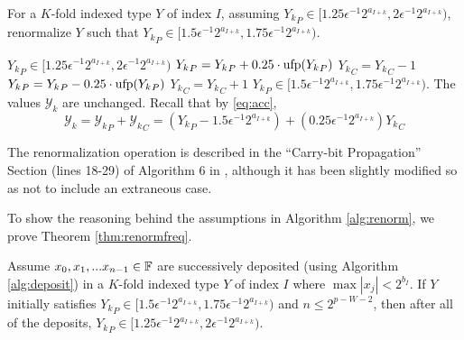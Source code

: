     \begin{samepage}
    \begin{alg}
      For a $K$-fold indexed type $Y$ of index $I$, assuming ${Y_k}_P \in [1.25  \epsilon^{-1} 2^{a_{I + k}}, 2  \epsilon^{-1} 2^{a_{I + k}})$, renormalize $Y$ such that ${Y_k}_P \in [1.5  \epsilon^{-1} 2^{a_{I + k}}, 1.75  \epsilon^{-1} 2^{a_{I + k}})$.
      \begin{algorithmic}[1]
        \Require
          \Statex ${Y_k}_P \in [1.25  \epsilon^{-1} 2^{a_{I + k}}, 2  \epsilon^{-1} 2^{a_{I + k}})$
              \State ${Y_k}_P = {Y_k}_P + 0.25 \cdot \text{ufp}({Y_k}_P)$
              \State ${Y_k}_C = {Y_k}_C - 1$
            \EndIf
              \State ${Y_k}_P = {Y_k}_P - 0.25 \cdot \text{ufp}({Y_k}_P)$
              \State ${Y_k}_C = {Y_k}_C + 1$
            \EndIf
          \EndFor
        \EndFunction
        \Ensure
          \Statex ${Y_k}_P \in [1.5  \epsilon^{-1} 2^{a_{I + k}}, 1.75  \epsilon^{-1} 2^{a_{I + k}})$.
          \Statex The values $\mathcal{Y}_k$ are unchanged. Recall that by \eqref{eq:acc},
          \begin{equation*}
            \mathcal{Y}_k = {\mathcal{Y}_k}_P + {\mathcal{Y}_k}_C = ({Y_k}_P - 1.5 \epsilon^{-1} 2^{a_{I + k}}) + (0.25\epsilon^{-1}2^{a_{I + k}}){Y_k}_C
          \end{equation*}
      \end{algorithmic}
      \label{alg:renorm}
    \end{alg}
    \end{samepage}
    The renormalization operation is described in the ``Carry-bit Propagation'' Section (lines 18-29) of Algorithm $6$ in \cite{repsum}, although it has been slightly modified so as not to include an extraneous case.

    To show the reasoning behind the assumptions in Algorithm \ref{alg:renorm}, we prove Theorem \ref{thm:renormfreq}.

      \begin{samepage}
    \begin{thm}
      Assume $x_0, x_1, ... x_{n - 1} \in \mathbb{F}$ are successively deposited (using Algorithm \ref{alg:deposit}) in a $K$-fold indexed type $Y$ of index $I$ where $\max|x_j| < 2^{b_I}$. If $Y$ initially satisfies ${Y_k}_P \in [1.5  \epsilon^{-1} 2^{a_{I + k}}, 1.75  \epsilon^{-1} 2^{a_{I + k}})$ and $n \leq 2^{p - W - 2}$, then after all of the deposits, ${Y_k}_P \in [1.25  \epsilon^{-1} 2^{a_{I + k}}, 2  \epsilon^{-1} 2^{a_{I + k}})$.
      \label{thm:renormfreq}
    \end{thm}
    \end{samepage}

